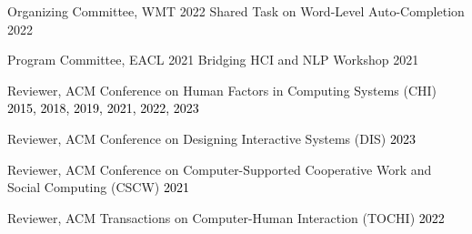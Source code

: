 \vspace{-1mm}








\thispagestyle{secondstyle}

\vspace{-2mm}



\vspace{-2mm}



\pagebreak

\vspace{-2mm}



\vspace{-2mm}





Organizing Committee, WMT 2022 Shared Task on Word-Level Auto-Completion \hfill 2022

Program Committee, EACL 2021 Bridging HCI and NLP Workshop \hfill 2021

Reviewer, ACM Conference on Human Factors in Computing Systems (CHI) \hfill \textcolor{black}{2015, 2018, 2019, 2021, 2022, 2023}

Reviewer, ACM Conference on Designing Interactive Systems (DIS) \hfill \textcolor{black}{2023}

Reviewer, ACM Conference on Computer-Supported Cooperative Work and Social Computing (CSCW) \hfill \textcolor{black}{2021}

Reviewer, ACM Transactions on Computer-Human Interaction (TOCHI) \hfill \textcolor{black}{2022}

